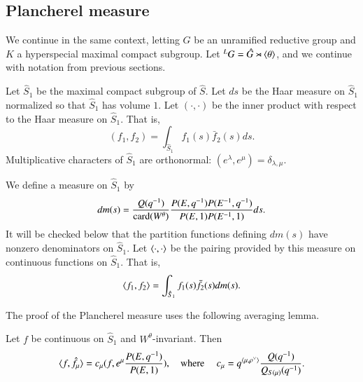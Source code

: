 \subsection{Plancherel measure}
We continue in the same context, letting $G$ be an unramified
reductive group and $K$ a hyperspecial maximal compact subgroup.  Let
${}^LG = \hat G\rtimes \langle{\theta}\rangle$, and we continue with notation
from previous sections.

Let ${\hat S}_1$ be the maximal compact subgroup of $\hat S$.  Let $ds$
be the Haar measure on $\hat S_1$ normalized so that $\hat S_1$ has
volume $1$.  Let $(\cdot,\cdot)$ be the inner product with respect to
the Haar measure on $\hat S_1$. That is,
\begin{equation}
(f_1,f_2) = \int_{\hat S_1} f_1(s) \bar f_2(s) ds.
\end{equation}
Multiplicative characters of $\hat S_1$ are orthonormal:
$(e^\lambda,e^\mu) = \delta_{\lambda,\mu}$.

We define a measure on $\hat S_1$ by
\begin{equation}
dm(s) = \frac{Q(q^{-1})}{{\operatorname{card}}(W^\theta)}
\frac{P(E,q^{-1}) P(E^{-1},q^{-1})}{P(E,1) P(E^{-1},1)} ds.
\end{equation}
It will be checked below that the partition functions defining $dm(s)$
have nonzero denominators on $\hat S_1$.  Let $\langle{\cdot,\cdot}\rangle$ be
the pairing provided by this measure on continuous functions on $\hat
S_1$.  That is,
\begin{equation}
\langle{f_1,f_2}\rangle = \int_{\hat S_1} f_1(s) \bar f_2(s) dm(s).
\end{equation}

The proof of the Plancherel measure uses the following averaging lemma.

\begin{lemma}\label{lemma:average} 
  Let $f$ be continuous on $\hat S_1$ and $W^\theta$-invariant.  Then
\[
\langle{f,\hat f_\mu}\rangle = c_\mu  (f, e^\mu\frac{ P(E,q^{-1})}{P(E,1)}),
\quad\text{where }\quad
c_\mu = q^{\langle{\mu,\rho^\vee}\rangle}\frac{ Q(q^{-1})}{Q_{S(\mu)}(q^{-1})}.
\]
\end{lemma}

